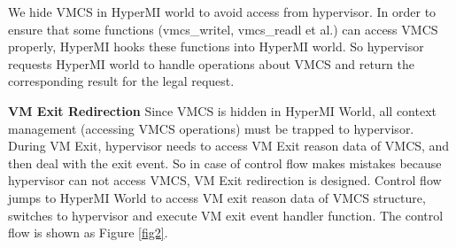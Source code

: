 \documentclass[conference]{IEEEtran}
\begin{document}
We hide VMCS in HyperMI world to avoid access from hypervisor. 
In order to ensure that some functions (vmcs\_writel, vmcs\_readl et al.) can access VMCS properly, HyperMI hooks these functions into HyperMI world. So hypervisor requests HyperMI world to handle operations about VMCS and return the corresponding result for the legal request. 

\textbf{VM Exit Redirection}
Since VMCS is hidden in HyperMI World, all context management (accessing VMCS operations)  must be trapped to hypervisor. During VM Exit, hypervisor needs to access  VM Exit reason data of VMCS, and then deal with the exit event. So in case of control flow makes mistakes because hypervisor can not access VMCS, VM Exit redirection is designed. Control flow jumps to HyperMI World to access VM exit reason data of VMCS structure, switches to hypervisor and execute VM exit event handler function. The control flow is shown as Figure \ref{fig2}.

\end{document}

